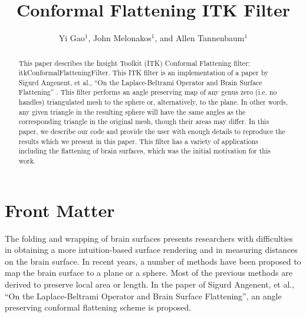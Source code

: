 \documentclass{InsightArticle}
\title{Conformal Flattening ITK Filter}
\author{Yi Gao$^{1}$, John Melonakos$^{1}$, and Allen Tannenbaum$^{1}$}
\begin{document}
\newif\ifpdf
\ifx\pdfoutput\undefined
  \pdffalse
\else
  \pdftrue
\fi


\ifpdf
\else
   \DeclareGraphicsExtensions{.eps,.jpg,.gif,.tiff,.bmp,.png}
   \DeclareGraphicsRule{.jpg}{eps}{.jpg.bb}{`convert #1 eps:-}
   \DeclareGraphicsRule{.gif}{eps}{.gif.bb}{`convert #1 eps:-}
   \DeclareGraphicsRule{.tiff}{eps}{.tiff.bb}{`convert #1 eps:-}
   \DeclareGraphicsRule{.bmp}{eps}{.bmp.bb}{`convert #1 eps:-}
   \DeclareGraphicsRule{.png}{eps}{.png.bb}{`convert #1 eps:-}
\fi


\maketitle


\ifhtml
\chapter*{Front Matter\label{front}}
\fi


\begin{abstract}
\noindent This paper describes the Insight Toolkit (ITK) Conformal
Flattening filter: itkConformalFlatteningFilter. This ITK filter is an
implementation of a paper by Sigurd Angenent, et al., ``On the
Laplace-Beltrami Operator and Brain Surface Flattening''
\cite{angenent1999lbo}. This filter performs an angle preserving map of any
genus zero (i.e. no handles) triangulated mesh to the sphere or,
alternatively, to the plane. In other words, any given triangle in the
resulting sphere will have the same angles as the corresponding
triangle in the original mesh, though their areas may differ. In this
paper, we describe our code and provide the user with enough details
to reproduce the results which we present in this paper. This filter
has a variety of applications including the flattening of brain
surfaces, which was the initial motivation for this work.
\end{abstract}

\tableofcontents

The folding and wrapping of brain surfaces presents researchers with
difficulties in obtaining a more intuition-based surface rendering and
in measuring distances on the brain surface. In recent years, a number
of methods have been proposed to map the brain surface to a plane or a
sphere. Most of the previous methods are derived to preserve local
area or length. In the paper of Sigurd Angenent, et al., ``On the
Laplace-Beltrami Operator and Brain Surface Flattening'', an angle
preserving conformal flattening scheme is proposed.
\end{document}
